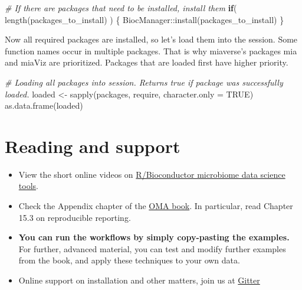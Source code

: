 \documentclass[
  oneside]{book}
\newenvironment{Shaded}{\begin{snugshade}}{\end{snugshade}}
\newcommand{\AttributeTok}[1]{\textcolor[rgb]{0.77,0.63,0.00}{#1}}
\newcommand{\CommentTok}[1]{\textcolor[rgb]{0.56,0.35,0.01}{\textit{#1}}}
\newcommand{\ConstantTok}[1]{\textcolor[rgb]{0.00,0.00,0.00}{#1}}
\newcommand{\ControlFlowTok}[1]{\textcolor[rgb]{0.13,0.29,0.53}{\textbf{#1}}}
\newcommand{\FunctionTok}[1]{\textcolor[rgb]{0.00,0.00,0.00}{#1}}
\newcommand{\NormalTok}[1]{#1}
\newcommand{\OtherTok}[1]{\textcolor[rgb]{0.56,0.35,0.01}{#1}}
\newcommand{\SpecialCharTok}[1]{\textcolor[rgb]{0.00,0.00,0.00}{#1}}
\begin{document}
\begin{Shaded}
\begin{Highlighting}[]
\CommentTok{\# If there are packages that need to be installed, install them }
\ControlFlowTok{if}\NormalTok{( }\FunctionTok{length}\NormalTok{(packages\_to\_install) ) \{}
\NormalTok{   BiocManager}\SpecialCharTok{::}\FunctionTok{install}\NormalTok{(packages\_to\_install)}
\NormalTok{\}}
\end{Highlighting}
\end{Shaded}

Now all required packages are installed, so let's load them into the session.
Some function names occur in multiple packages. That is why miaverse's packages
mia and miaViz are prioritized. Packages that are loaded first have higher priority.

\begin{Shaded}
\begin{Highlighting}[]
\CommentTok{\# Loading all packages into session. Returns true if package was successfully loaded.}
\NormalTok{loaded }\OtherTok{\textless{}{-}} \FunctionTok{sapply}\NormalTok{(packages, require, }\AttributeTok{character.only =} \ConstantTok{TRUE}\NormalTok{)}
\FunctionTok{as.data.frame}\NormalTok{(loaded)}
\end{Highlighting}
\end{Shaded}

\hypertarget{reading-and-support}{%
\section{Reading and support}\label{reading-and-support}}

\begin{itemize}
\item
  View the short online videos on \href{https://www.youtube.com/playlist?list=PLjiXAZO27elAJEptP59BN3whVJ61XIkST}{R/Bioconductor microbiome data science tools}.
\item
  Check the Appendix chapter of the \href{https://microbiome.github.io/OMA}{OMA
  book}. In particular, read Chapter
  15.3 on reproducible reporting.
\item
  \textbf{You can run the workflows by simply copy-pasting the examples.} For
  further, advanced material, you can test and modify further examples
  from the book, and apply these techniques to your own data.
\item
  Online support on installation and other matters, join us at \href{https://gitter.im/microbiome/miaverse?utm_source=badge\&utm_medium=badge\&utm_campaign=pr-badge\&utm_content=badge}{Gitter}
\end{itemize}
\end{document}
